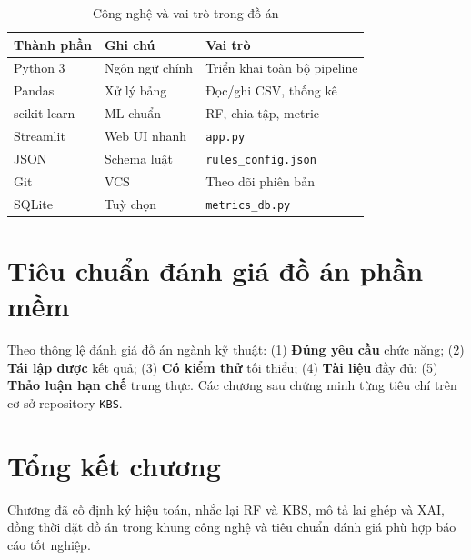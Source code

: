\begin{table}[!htbp]
\centering
\caption{Công nghệ và vai trò trong đồ án}
\label{tab:stack}
\begin{tabular}{llp{7.2cm}}
\toprule
Thành phần & Ghi chú & Vai trò \\
\midrule
Python 3 & Ngôn ngữ chính & Triển khai toàn bộ pipeline \\
Pandas & Xử lý bảng & Đọc/ghi CSV, thống kê \\
scikit-learn & ML chuẩn & RF, chia tập, metric \\
Streamlit & Web UI nhanh & \texttt{app.py} \\
JSON & Schema luật & \texttt{rules\_config.json} \\
Git & VCS & Theo dõi phiên bản \\
SQLite & Tuỳ chọn & \texttt{metrics\_db.py} \\
\bottomrule
\end{tabular}
\end{table}
\FloatBarrier

\section{Tiêu chuẩn đánh giá đồ án phần mềm}
Theo thông lệ đánh giá đồ án ngành kỹ thuật: (1) \textbf{Đúng yêu cầu} chức năng; (2) \textbf{Tái lập được} kết quả; (3) \textbf{Có kiểm thử} tối thiểu; (4) \textbf{Tài liệu} đầy đủ; (5) \textbf{Thảo luận hạn chế} trung thực. Các chương sau chứng minh từng tiêu chí trên cơ sở repository \texttt{KBS}.

\section{Tổng kết chương}
Chương đã cố định ký hiệu toán, nhắc lại RF và KBS, mô tả lai ghép và XAI, đồng thời đặt đồ án trong khung công nghệ và tiêu chuẩn đánh giá phù hợp báo cáo tốt nghiệp.
